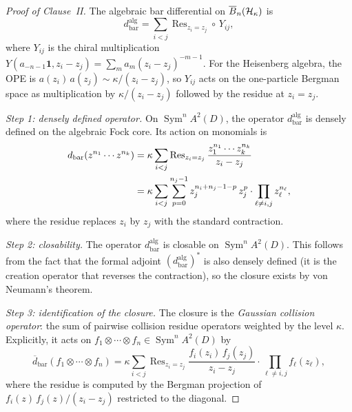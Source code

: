 \begin{proof}[Proof of Clause~II]
The algebraic bar differential on $\overline{B}_n(\mathcal{H}_\kappa)$ is
\[
d_{\mathrm{bar}}^{\mathrm{alg}}
= \sum_{i < j}
\operatorname{Res}_{z_i = z_j}
\circ\, Y_{ij},
\]
where $Y_{ij}$ is the chiral multiplication
$Y(a_{-n-1}\mathbf{1}, z_i - z_j)
= \sum_m a_m (z_i - z_j)^{-m-1}$.
For the Heisenberg algebra, the OPE is
$a(z_i)\,a(z_j) \sim \kappa/(z_i - z_j)$,
so $Y_{ij}$ acts on the one-particle Bergman space as
multiplication by $\kappa/(z_i - z_j)$ followed by the residue
at $z_i = z_j$.

\emph{Step 1: densely defined operator.}
On $\operatorname{Sym}^n A^2(D)$, the operator
$d_{\mathrm{bar}}^{\mathrm{alg}}$ is densely defined on the
algebraic Fock core. Its action on monomials is
\begin{align}
d_{\mathrm{bar}}(z^{n_1} \cdots z^{n_k})
&= \kappa \sum_{i < j}
\operatorname{Res}_{z_i = z_j}
\frac{z_1^{n_1} \cdots z_k^{n_k}}{z_i - z_j}
\notag\\
&= \kappa \sum_{i < j}
\sum_{p=0}^{n_j-1}
z_j^{n_i + n_j - 1 - p}\, z_j^p
\cdot \prod_{\ell \neq i,j} z_\ell^{n_\ell},
\end{align}
where the residue replaces $z_i$ by $z_j$ with the standard
contraction.

\emph{Step 2: closability.}
The operator $d_{\mathrm{bar}}^{\mathrm{alg}}$ is closable
on $\operatorname{Sym}^n A^2(D)$. This follows from the
fact that the formal adjoint $(d_{\mathrm{bar}}^{\mathrm{alg}})^*$
is also densely defined (it is the creation operator that reverses
the contraction), so the closure exists by von Neumann's theorem.

\emph{Step 3: identification of the closure.}
The closure is the \emph{Gaussian collision operator}: the sum
of pairwise collision residue operators weighted by the level
$\kappa$. Explicitly, it acts on
$f_1 \otimes \cdots \otimes f_n \in \operatorname{Sym}^n A^2(D)$
by
\[
\overline{d}_{\mathrm{bar}}(f_1 \otimes \cdots \otimes f_n)
= \kappa \sum_{i < j}
\operatorname{Res}_{z_i = z_j}
\frac{f_i(z_i)\,f_j(z_j)}{z_i - z_j}
\cdot \prod_{\ell \neq i,j} f_\ell(z_\ell),
\]
where the residue is computed by the Bergman projection
of $f_i(z)\,f_j(z) / (z_i - z_j)$ restricted to the diagonal.


\end{proof}
